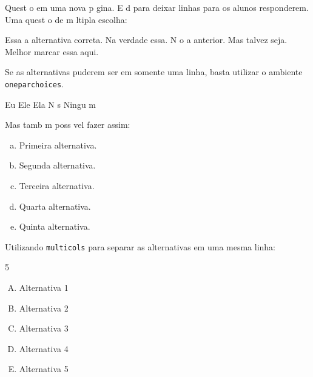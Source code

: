 \documentclass{article}
\begin{document}
\begin{questions}
		\newpage
		\question
		Quest o em uma nova p gina. E d  para deixar linhas para os alunos responderem.
		\fillwithlines{5cm}
		\question
		Uma quest o de m ltipla escolha:
			\begin{choices}
				\choice Essa   a alternativa correta.
				\choice Na verdade   essa.
				\choice N o   a anterior.
				\choice Mas talvez seja.
				\choice Melhor marcar essa aqui.
			\end{choices}
		\question
		Se as alternativas puderem ser em somente uma linha, basta utilizar o ambiente \texttt{oneparchoices}.
			\begin{oneparchoices}
				\choice Eu
				\choice Ele
				\choice Ela
				\choice N s
				\choice Ningu m
			\end{oneparchoices}
		\question
		Mas tamb m   poss vel fazer assim:
			\begin{enumerate}[a)]
				\item Primeira alternativa.
				\item Segunda alternativa.
				\item Terceira alternativa.
				\item Quarta alternativa.
				\item Quinta alternativa.
			\end{enumerate}
		\question
		Utilizando \texttt{multicols} para separar as alternativas em uma mesma linha:
			\begin{multicols}{5}
				\begin{enumerate}[(A)]
					\item Alternativa 1
					\item Alternativa 2
					\item Alternativa 3
					\item Alternativa 4
					\item Alternativa 5

\end{enumerate}
\end{multicols}
\end{questions}
\end{document}
